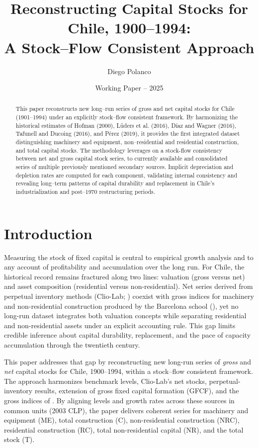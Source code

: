 \documentclass[11pt,a4paper]{article}
\title{Reconstructing Capital Stocks for Chile, 1900--1994: \\
A Stock–Flow Consistent Approach}
\author{Diego Polanco}
\date{Working Paper – 2025}
\begin{document}
\maketitle


\begin{abstract}
This paper reconstructs new long–run series of gross and net capital stocks for Chile (1901–1994) under an explicitly stock–flow consistent framework. 
By harmonizing the historical estimates of Hofman (2000), Lüders et al. (2016), Díaz and Wagner (2016), Tafunell and Ducoing (2016), and Pérez (2019), 
it provides the first integrated dataset distinguishing machinery and equipment, non–residential and residential construction, and total capital stocks. 
The methodology leverages on a stock-flow consistency between net and gross capital stock series, to currently available and consolidated series of multiple previously mentioned secondary sources. Implicit depreciation and depletion rates are computed for each component, validating internal consistency and revealing long–term patterns of capital durability and replacement in Chile’s industrialization and post–1970 restructuring periods. 
\end{abstract}

\pagebreak
\section{Introduction}


Measuring the stock of fixed capital is central to empirical growth analysis and to any account of profitability and accumulation over the long run. For Chile, the historical record remains fractured along two lines: valuation (gross versus net) and asset composition (residential versus non-residential). Net series derived from perpetual inventory methods (Clio-Lab; \citealt{Luders2016,Diaz2016}) coexist with gross indices for machinery and non-residential construction produced by the Barcelona school (\citealt{TafunellDucoing2016}), yet no long-run dataset integrates both valuation concepts while separating residential and non-residential assets under an explicit accounting rule. This gap limits credible inference about capital durability, replacement, and the pace of capacity accumulation through the twentieth century.

This paper addresses that gap by reconstructing new long-run series of \emph{gross} and \emph{net} capital stocks for Chile, 1900–1994, within a stock–flow consistent framework. The approach harmonizes \citet{Hofman2000a} benchmark levels, Clio-Lab’s net stocks, \citet{DiazWagner2016} perpetual-inventory results, \citet{PerezEyzaguirre2019} extension of gross fixed capital formation (GFCF), and the gross indices of \citet{TafunellDucoing2016}. By aligning levels and growth rates across these sources in common units (2003 CLP), the paper delivers coherent series for machinery and equipment (ME), total construction (C), non-residential construction (NRC), residential construction (RC), total non-residential capital (NR), and the total stock (T).
\end{document}
